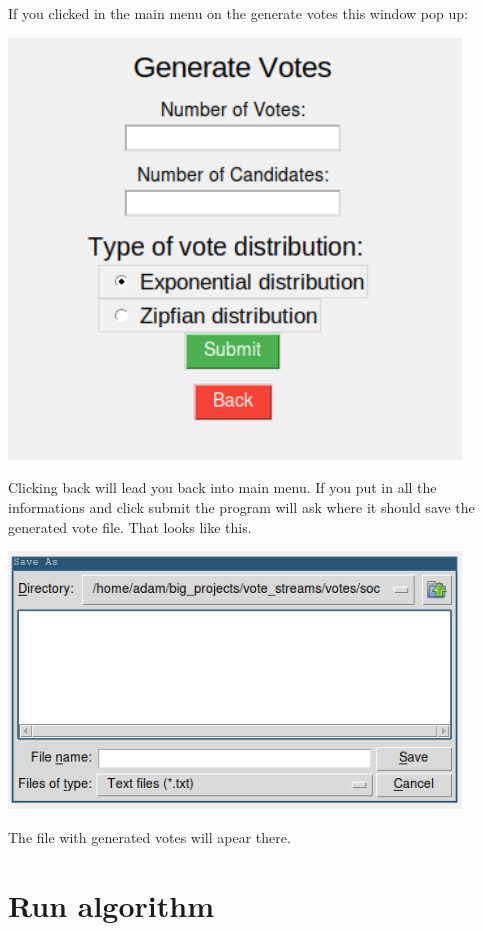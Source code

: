 \documentclass[a4paper,12pt]{report}
\begin{document}
	If you clicked in the main menu on the generate votes this window pop up:
	
	\begin{center}
		\includegraphics[width=12cm]{generate_votes.png}
	\end{center}
	
	Clicking back will lead you back into main menu. If you put in all the informations and click submit the program will ask where it should save the generated vote file. That looks like this.
	
	\begin{center}
		\includegraphics[width=12cm]{save_as.png}
	\end{center}
	
	The file with generated votes will apear there.
	
	\section{Run algorithm}
	
\end{document}
